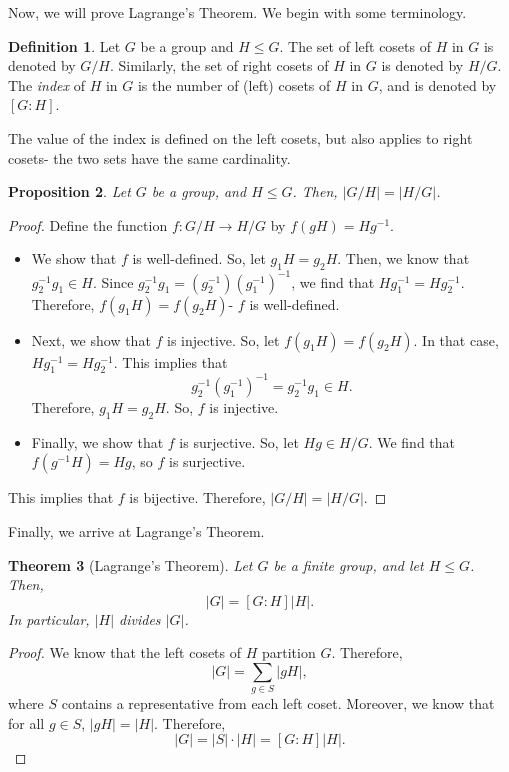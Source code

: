 \documentclass[a4paper, openany]{memoir}
\theoremstyle{definition}
\newtheorem{definition}{Definition}[section]
\theoremstyle{plain}
\newtheorem{theorem}[definition]{Theorem}
\newtheorem{proposition}[definition]{Proposition}
\begin{document}
Now, we will prove Lagrange's Theorem. We begin with some terminology.
\begin{definition}
Let $G$ be a group and $H \leqslant G$. The set of left cosets of $H$ in $G$ is denoted by $G/H$. Similarly, the set of right cosets of $H$ in $G$ is denoted by $H/G$. The \emph{index} of $H$ in $G$ is the number of (left) cosets of $H$ in $G$, and is denoted by $[G:H]$.
\end{definition}
\noindent The value of the index is defined on the left cosets, but also applies to right cosets- the two sets have the same cardinality.
\begin{proposition}
Let $G$ be a group, and $H \leqslant G$. Then, $|G/H| = |H/G|$.
\end{proposition}
\begin{proof}
Define the function $f: G/H \to H/G$ by $f(gH) = Hg^{-1}$.
\begin{itemize}
    \item We show that $f$ is well-defined. So, let $g_1H = g_2H$. Then, we know that $g_2^{-1}g_1 \in H$. Since $g_2^{-1}g_1 = (g_2^{-1}) (g_1^{-1})^{-1}$, we find that $Hg_1^{-1} = Hg_2^{-1}$. Therefore, $f(g_1H) = f(g_2H)$- $f$ is well-defined.
    \item Next, we show that $f$ is injective. So, let $f(g_1H) = f(g_2H)$. In that case, $Hg_1^{-1} = Hg_2^{-1}$. This implies that 
    \[g_2^{-1} (g_1^{-1})^{-1} = g_2^{-1} g_1 \in H.\]
    Therefore, $g_1H = g_2H$. So, $f$ is injective.
    \item Finally, we show that $f$ is surjective. So, let $Hg \in H/G$. We find that $f(g^{-1}H) = Hg$, so $f$ is surjective.
\end{itemize}
This implies that $f$ is bijective. Therefore, $|G/H| = |H/G|$.
\end{proof}
\noindent Finally, we arrive at Lagrange's Theorem.
\begin{theorem}[Lagrange's Theorem]
Let $G$ be a finite group, and let $H \leqslant G$. Then, 
\[|G| = [G:H] |H|.\]
In particular, $|H|$ divides $|G|$.
\end{theorem}
\begin{proof}
We know that the left cosets of $H$ partition $G$. Therefore,
\[|G| = \sum_{g \in S} |gH|,\]
where $S$ contains a representative from each left coset. Moreover, we know that for all $g \in S$, $|gH| = |H|$. Therefore,
\[|G| = |S| \cdot |H| = [G:H] |H|.\]
\end{proof}
\end{document}
